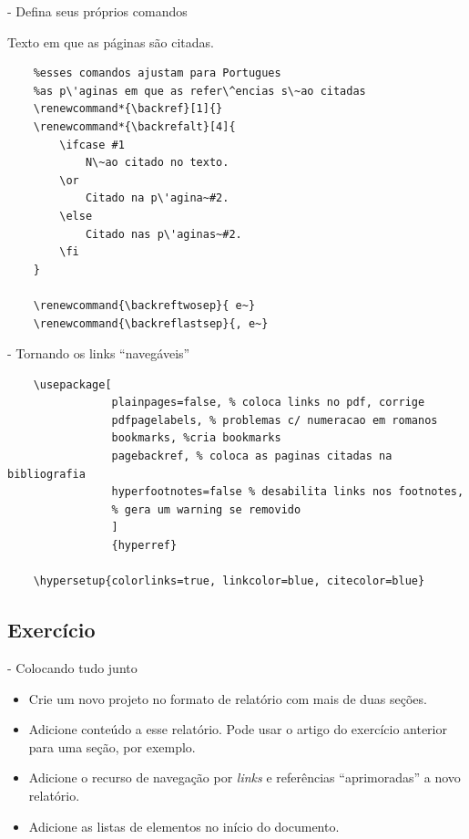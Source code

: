 \documentclass[xcolor=table]{beamer}
\begin{document}
\begin{frame}[fragile]{\insertsubsection{} - Defina seus próprios comandos}

 Texto em que as páginas são citadas.
 
\begin{verbatim}
	%esses comandos ajustam para Portugues 
	%as p\'aginas em que as refer\^encias s\~ao citadas
	\renewcommand*{\backref}[1]{}
	\renewcommand*{\backrefalt}[4]{
	    \ifcase #1
	        N\~ao citado no texto.
	    \or
	        Citado na p\'agina~#2.
	    \else
	        Citado nas p\'aginas~#2.
	    \fi
	}
	
	\renewcommand{\backreftwosep}{ e~}
	\renewcommand{\backreflastsep}{, e~}
\end{verbatim}
\end{frame}


\begin{frame}[fragile]{\insertsubsection{} - Tornando os links ``navegáveis''}

	\begin{verbatim}
	\usepackage[            
	            plainpages=false, % coloca links no pdf, corrige
	            pdfpagelabels, % problemas c/ numeracao em romanos            
	            bookmarks, %cria bookmarks 
	            pagebackref, % coloca as paginas citadas na bibliografia
	            hyperfootnotes=false % desabilita links nos footnotes, 
   	            % gera um warning se removido
	            ] 
	            {hyperref} 
	
	\hypersetup{colorlinks=true, linkcolor=blue, citecolor=blue}
	\end{verbatim}

\end{frame}

\subsection{Exercício}
\begin{frame}[fragile]{\insertsubsection{} - Colocando tudo junto}

\begin{itemize}
	\item Crie um novo projeto no formato de relatório com mais de duas seções.
	\item Adicione conteúdo a esse relatório. Pode usar o artigo do exercício anterior para uma seção, por exemplo.
	\item Adicione o recurso de navegação por \textit{links} e referências ``aprimoradas''  a novo relatório.
	\item Adicione as listas de elementos no início do documento.
\end{itemize}


\end{frame}
\end{document}

